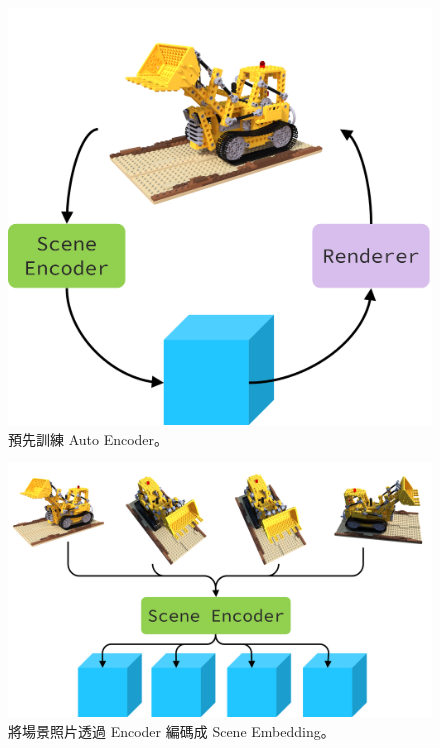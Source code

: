 \documentclass[10pt,twocolumn,letterpaper]{article}
\begin{document}
\begin{CJK}{UTF8}{bkai}
   \begin{figure}[t]
      \begin{center}
         \includegraphics[width=1\linewidth]{img/auto-encoder.png}
      \end{center}
      \caption{
         預先訓練 Auto Encoder。
      }
      \label{fig:auto-encoder}
   \end{figure}

   \begin{figure}[t]
      \begin{center}
         \includegraphics[width=1\linewidth]{img/encode-scene.png}
      \end{center}
      \caption{
         將場景照片透過 Encoder 編碼成 Scene Embedding。
      }
      \label{fig:encode-scene}
   \end{figure}


\end{CJK}
\end{document}
